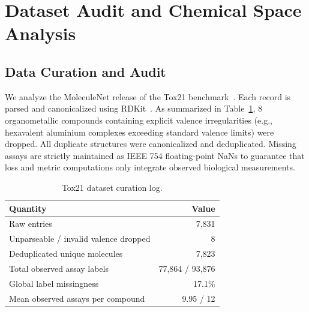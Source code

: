 \documentclass[conference]{IEEEtran}
\begin{document}
\section{Dataset Audit and Chemical Space Analysis}
\subsection{Data Curation and Audit}
We analyze the MoleculeNet release of the Tox21 benchmark~\cite{wu2018moleculenet}. Each record is parsed and canonicalized using RDKit~\cite{rdkit}. As summarized in Table~\ref{tab:clean}, 8 organometallic compounds containing explicit valence irregularities (e.g., hexavalent aluminium complexes exceeding standard valence limits) were dropped. All duplicate structures were canonicalized and deduplicated. Missing assays are strictly maintained as IEEE 754 floating-point NaNs to guarantee that loss and metric computations only integrate observed biological measurements.

\begin{table}[t]
\centering\small
\caption{Tox21 dataset curation log.}\label{tab:clean}
\begin{tabular}{@{}lr@{}}
\toprule
Quantity & Value \\
\midrule
Raw entries & 7{,}831 \\
Unparseable / invalid valence dropped & 8 \\
Deduplicated unique molecules & 7{,}823 \\
Total observed assay labels & 77{,}864 / 93{,}876 \\
Global label missingness & 17.1\% \\
Mean observed assays per compound & 9.95 / 12 \\
\bottomrule
\end{tabular}
\end{table}
\end{document}
